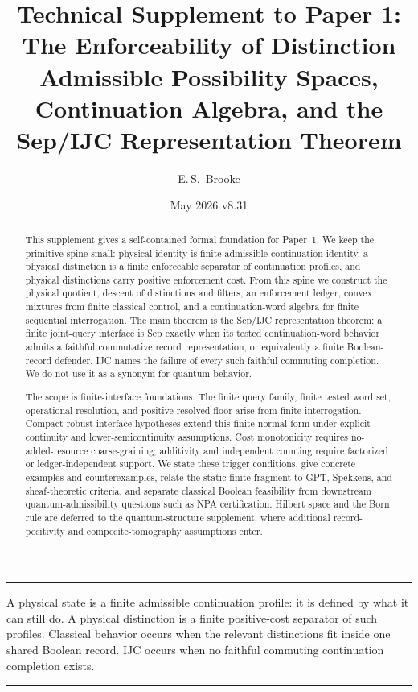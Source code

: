 \documentclass[11pt]{article}
\title{Technical Supplement to Paper 1:\\
The Enforceability of Distinction\\[2pt]
\large Admissible Possibility Spaces, Continuation Algebra, and the Sep/IJC Representation Theorem}
\author{E.\,S.\ Brooke}
\date{May 2026 \quad\textbar\quad v8.31}
\newenvironment{apfbox}{\par\medskip\hrule\vspace{0.5em}}{\vspace{0.5em}\hrule\par\medskip}
\begin{document}
\maketitle

\begin{abstract}
This supplement gives a self-contained formal foundation for Paper~1. We keep the primitive spine small: physical identity is finite admissible continuation identity, a physical distinction is a finite enforceable separator of continuation profiles, and physical distinctions carry positive enforcement cost. From this spine we construct the physical quotient, descent of distinctions and filters, an enforcement ledger, convex mixtures from finite classical control, and a continuation-word algebra for finite sequential interrogation. The main theorem is the Sep/IJC representation theorem: a finite joint-query interface is Sep exactly when its tested continuation-word behavior admits a faithful commutative record representation, or equivalently a finite Boolean-record defender. IJC names the failure of every such faithful commuting completion. We do not use it as a synonym for quantum behavior.

The scope is finite-interface foundations. The finite query family, finite tested word set, operational resolution, and positive resolved floor arise from finite interrogation. Compact robust-interface hypotheses extend this finite normal form under explicit continuity and lower-semicontinuity assumptions. Cost monotonicity requires no-added-resource coarse-graining; additivity and independent counting require factorized or ledger-independent support. We state these trigger conditions, give concrete examples and counterexamples, relate the static finite fragment to GPT, Spekkens, and sheaf-theoretic criteria, and separate classical Boolean feasibility from downstream quantum-admissibility questions such as NPA certification. Hilbert space and the Born rule are deferred to the quantum-structure supplement, where additional record-positivity and composite-tomography assumptions enter.
\end{abstract}

\begin{apfbox}
A physical state is a finite admissible continuation profile: it is defined by what it can still do. A physical distinction is a finite positive-cost separator of such profiles. Classical behavior occurs when the relevant distinctions fit inside one shared Boolean record. IJC occurs when no faithful commuting continuation completion exists.
\end{apfbox}
\end{document}
